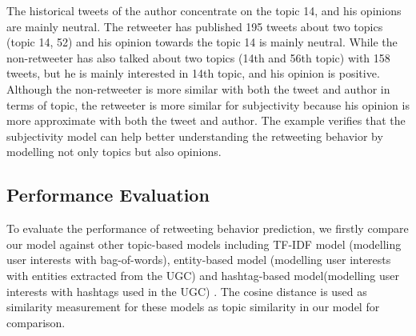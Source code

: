 \documentclass{acm_proc_article-sp}
\begin{document}
The historical tweets of the author concentrate on the topic 14, and his opinions are mainly neutral.
The retweeter has published 195 tweets about two topics (topic 14, 52) and his opinion towards the topic 14 is mainly neutral. 
While the non-retweeter has also talked about two topics (14th and 56th topic) with 158 tweets, but he is mainly interested in 14th topic, and his opinion is positive. 
Although the non-retweeter is more similar with both the tweet and author in terms of topic, the retweeter is more similar for subjectivity because his opinion is more approximate with both the tweet and author. The example verifies that the subjectivity model can help better understanding the retweeting behavior by modelling not only topics but also opinions.

\subsection{Performance Evaluation}

To evaluate the performance of retweeting behavior prediction, we firstly compare our model against other topic-based models including TF-IDF model (modelling user interests with bag-of-words), entity-based model (modelling user interests with entities extracted from the UGC) and hashtag-based model(modelling user interests with hashtags used in the UGC) \cite{abel2011analyzing}. The cosine distance is used as similarity measurement for these models as topic similarity in our model for comparison.
\end{document}
